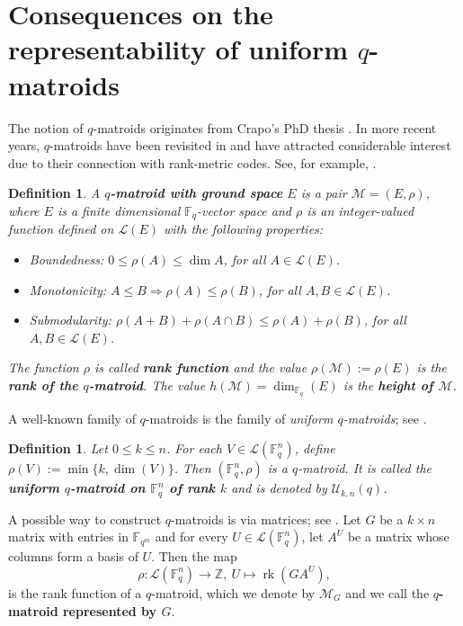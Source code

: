 \documentclass[11pt]{amsart}
\DeclareMathOperator{\rk}{rk}
\newtheorem{definition}[theorem]{Definition}
\newcommand{\mM}{\mathcal{M}}
\newcommand{\mL}{\mathcal{L}}
\newcommand{\mU}{\mathcal{U}}
\newcommand{\F}{{\mathbb F}}
\begin{document}
\section{Consequences on the representability of uniform $q$-matroids}

The notion of $q$-matroids originates from Crapo’s PhD thesis \cite{crapo1964theory}. In more recent years, $q$-matroids have been revisited in \cite{jurrius2018defining} and have attracted considerable interest due to their connection with rank-metric codes. See, for example, \cite{gorla2019rank, shiromoto2019codes, ghorpade2020polymatroid, byrne2022constructions, byrne2021weighted, gluesing2021q}.

\begin{definition}
    A \textbf{$q$-matroid with ground space} $E$ is a pair $\mM=(E,\rho)$, where $E$ is a finite dimensional $\F_q$-vector space and $\rho$ is an integer-valued 
	function defined on $\mL(E)$ with the following properties:
	\begin{itemize}
		\item[(R1)] Boundedness: $0\leq \rho(A) \leq \dim A$, for all $A\in \mL(E)$. 
		\item[(R2)] Monotonicity: $A\leq B \Rightarrow \rho(A)\leq \rho(B)$, for all $A,B\in\mL(E)$. 
		\item[(R3)] Submodularity: $\rho(A+ B)+\rho(A\cap B)\leq \rho(A)+\rho(B)$, for all $A,B\in\mL(E)$.  
	\end{itemize}
The function $\rho$ is called \textbf{rank function} and the value $\rho(\mM) := \rho(E)$ is the \textbf{rank of the $q$-matroid}. The value $h(\mM)=\dim_{\F_q}(E)$ is the \textbf{height of $\mM$}.
\end{definition}

A well-known family of $q$-matroids is the family of \emph{uniform $q$-matroids}; see \cite{jurrius2018defining}.

\begin{definition}\label{def:uniform}
Let $0\leq k\leq n$. For each $V\in\mL(\F_q^n)$, define $\rho(V) :=\min\{k,\dim(V)\}$. Then $(\F_q^n,\rho)$ is a $q$-matroid. It is called the \textbf{uniform $q$-matroid on $\F_q^n$ of rank $k$} and is denoted by $\mU_{k,n}(q)$.
\end{definition}

A possible way to construct $q$-matroids is via matrices; see \cite{jurrius2018defining, gorla2019rank}. Let $G$ be a $k \times n$ matrix with entries in $\F_{q^m}$ and for every $U\in\mL(\F_q^n)$, let $A^U$ be a matrix whose columns form a basis of $U$. Then the map 
\begin{equation}\label{eq:rank1}
    \rho:\mL(\F_q^n) \to \mathbb{Z}, \  U\mapsto \rk(G A^U),
\end{equation}
is the rank function of a $q$-matroid, which we denote by $\mM_G$ and we call the \textbf{$q$-matroid represented by $G$}. 
\end{document}
